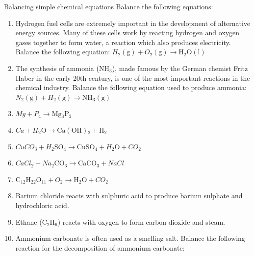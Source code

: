             \begin{exercises}{ Balancing simple chemical equations
        }
            \nopagebreak
        \label{m38726*id65193}Balance the following equations:\par 
        \label{m38726*id65199}\begin{enumerate}[noitemsep, label=\textbf{\arabic*}. ] 
            \label{m38726*uid17}\item Hydrogen fuel cells are extremely important in the development of alternative energy sources. Many of these cells work by reacting hydrogen and oxygen gases together to form water, a reaction which also produces electricity. Balance the following equation: ${{H}}_{2}\left(\mathrm{g}\right)+{{O}}_{2}\left(\mathrm{g}\right)\to \mathrm{H}{}_{2}\mathrm{O}\left(\mathrm{l}\right)$        \label{m38726*uid18}\item The synthesis of ammonia ($\mathrm{NH}{}_{3}$), made famous by the German chemist Fritz Haber in the early 20th century, is one of the most important reactions in the chemical industry. Balance the following equation used to produce ammonia:
${{N}}_{2}\left(\mathrm{g}\right)+{{H}}_{2}\left(\mathrm{g}\right)\to \mathrm{NH}{}_{3}\left(\mathrm{g}\right)$
        \label{m38726*uid19}\item 
          ${Mg}+{{P}}_{4}\to \mathrm{Mg}{}_{3}{\mathrm{P}}_{2}$
        \label{m38726*uid20}\item 
          ${Ca}+{{H}}_{2}\mathrm{O}\to \mathrm{Ca\left(OH\right)}{}_{2}+\mathrm{H}{}_{2}$        \label{m38726*uid21}\item 
          ${{CuCO}}_{3}+{{H}}_{2}{\mathrm{SO}}_{4}\to \mathrm{CuSO}{}_{4}+{{H}}_{2}\mathrm{O}+{{CO}}_{2}$
        \label{m38726*uid22}\item 
          ${{CaCl}}_{2}+{{Na}}_{2}{\mathrm{CO}}_{3}\to \mathrm{CaCO}{}_{3}+{NaCl}$        \label{m38726*uid23}\item 
          ${\mathrm{C}}_{12}{\mathrm{H}}_{22}{\mathrm{O}}_{11}+{{O}}_{2}\to \mathrm{H}{}_{2}\mathrm{O}+{{CO}}_{2}$
          \hspace{1ex}        \label{m38726*uid24}\item Barium chloride reacts with sulphuric acid to produce barium sulphate and hydrochloric acid.
        \label{m38726*uid25}\item Ethane (${\mathrm{C}}_{2}{\mathrm{H}}_{6}$) reacts with oxygen to form carbon dioxide and steam.
        \label{m38726*uid26}\item Ammonium carbonate is often used as a smelling salt. Balance the following reaction for the decomposition of ammonium carbonate:

\end{enumerate}
\end{exercises}
